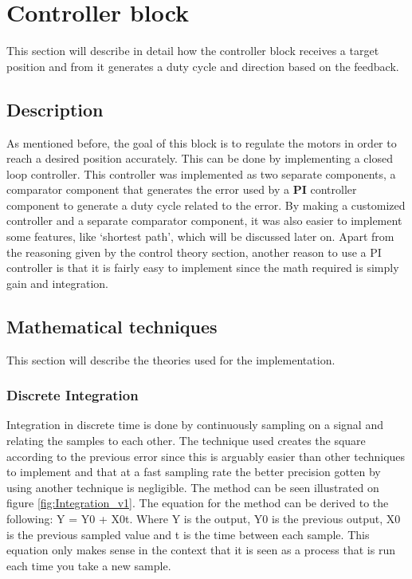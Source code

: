 \section{Controller block}
This section will describe in detail how the controller block receives a target position and from it generates a duty cycle and direction based on the feedback.

\subsection{Description}

As mentioned before, the goal of this block is to regulate the motors in order to reach a desired position accurately. This can be done by implementing a closed loop controller. This controller was implemented as two separate components, a comparator component that generates the error used by a \textbf{PI} controller component to generate a duty cycle related to the error. By making a customized controller and a separate comparator component, it was also easier to implement some features, like ‘shortest path’, which will be discussed later on. 
Apart from the reasoning given by the control theory section, another reason to use a PI controller is that it is fairly easy to implement since the math required is simply gain and integration.


\subsection{Mathematical techniques}

This section will describe the theories used for the implementation.


\subsubsection{Discrete Integration}

Integration in discrete time is done by continuously sampling on a signal and relating the samples to each other. The technique used creates the square according to the previous error since this is arguably easier than other techniques to implement and that at a fast sampling rate the better precision gotten by using another technique is negligible. The method can be seen illustrated on figure \ref{fig:Integration_v1}.
The equation for the method can be derived to the following: Y = Y0 + X0t. Where Y is the output, Y0 is the previous output, X0 is the previous sampled value and t is the time between each sample. This equation only makes sense in the context that it is seen as a process that is run each time you take a new sample.


